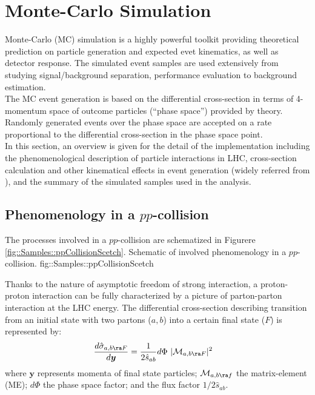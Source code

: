 \section{Monte-Carlo Simulation} \label{sec::Samples}
Monte-Carlo (MC) simulation is a highly powerful toolkit providing theoretical prediction on particle generation and expected evet kinematics, as well as detector response. The simulated event samples are used extensively from studying signal/background separation, performance evaluation to background estimation. \\

The MC event generation is based on the differential cross-section in terms of 4-momentum space of outcome particles (``phase space'') provided by theory. Randomly generated events over the phase space are accepted on a rate proportional to the differential cross-section in the phase space point. \\

In this section, an overview is given for the detail of the implementation including the phenomenological description of particle interactions in LHC, cross-section calculation and other kinematical effects in event generation (widely referred from \cite{ATLAS_generator}\cite{SkandsQCD}), and the summary of the simulated samples used in the analysis.  \\


\subsection{Phenomenology in a $pp$-collision}
The processes involved in a $pp$-collision are schematized in Figurere \ref{fig::Samples::ppCollisionScetch}.
{Schematic of involved phenomenology in a $pp$-collision.}
{fig::Samples::ppCollisionScetch}

Thanks to the nature of asymptotic freedom of strong interaction, a proton-proton interaction can be fully characterized by a picture of parton-parton interaction at the LHC energy. 
The differential cross-section describing transition from an initial state with two partons ($a, b$) into a certain final state ($F$) is represented by: 
\begin{align}
\frac{d\hat{\sigma}_{a,b \ra F}}{d\bm{y}} & = \frac{1}{2 \hat{s}_{ab}} d\Phi \,\, |\mathcal{M}_{a,b \ra F}|^2  
\label{ppXsec}
\end{align}
where $\bm{y}$ represents momenta of final state particles; $\mathcal{M}_{a,b \ra f}$ the matrix-element (ME); $d\Phi$ the phase space factor; and the flux factor $1/2\hat{s}_{ab}$.

